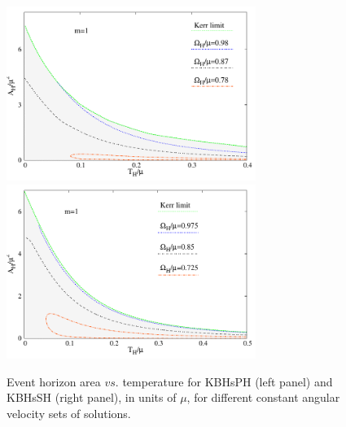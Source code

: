 \begin{figure}[h!]
  \begin{center}
    \includegraphics[width=8.1cm]{papers/Proca/BH-TH-AH.pdf}
      \includegraphics[width=8.1cm]{papers/Proca/scalar-BH-TH-AH.pdf}
  \end{center}
 \caption{Event horizon area $vs.$ temperature for KBHsPH (left panel) and KBHsSH (right panel), in units of $\mu$, for different constant angular velocity sets of solutions.}
  \label{temperature}
\end{figure}
